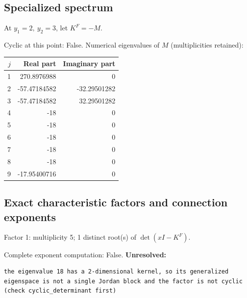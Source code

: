 \documentclass[10pt,a4paper]{article}
\newcommand{\fitmath}[1]{\sbox{\mathbox}{$\displaystyle #1$}\ifdim\wd\mathbox>\linewidth\resizebox{\linewidth}{!}{\usebox{\mathbox}}\else\usebox{\mathbox}\fi}
\begin{document}
\subsection*{Specialized spectrum}
At $y_1=2,\ y_2=3$, let $K^F=-M$.
\begin{center}\fitmath{\Delta=0}\end{center}
Cyclic at this point: False.
Numerical eigenvalues of $M$ (multiplicities retained):
\begin{center}\small\begin{tabular}{rrr}\toprule $j$ & Real part & Imaginary part\\\midrule
1 & 270.8976988 & 0\\
2 & -57.47184582 & -32.29501282\\
3 & -57.47184582 & 32.29501282\\
4 & -18 & 0\\
5 & -18 & 0\\
6 & -18 & 0\\
7 & -18 & 0\\
8 & -18 & 0\\
9 & -17.95400716 & 0\\
\bottomrule\end{tabular}\end{center}
\subsection*{Exact characteristic factors and connection exponents}
Factor 1: multiplicity 5; 1 distinct root(s) of $\det(xI-K^F)$.
\begin{center}\fitmath{\begin{aligned}p_{1}(x)&=x - 18\end{aligned}}\end{center}
Complete exponent computation: False.
\textbf{Unresolved:}

\begin{lstlisting}
the eigenvalue 18 has a 2-dimensional kernel, so its generalized eigenspace is not a single Jordan block and the factor is not cyclic (check cyclic_determinant first)
\end{lstlisting}
\end{document}
